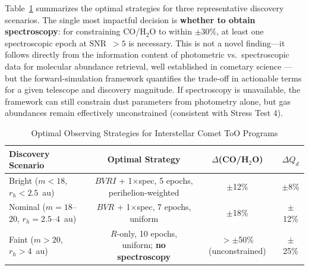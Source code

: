 \documentclass[usenatbib]{mnras}
\newcommand{\tablecomments}[1]{\vspace{4pt}{\footnotesize #1}\vspace{2pt}}
\begin{document}
Table~\ref{tab:obsopt_results} summarizes the optimal strategies for three representative discovery scenarios. The single most impactful decision is \textbf{whether to obtain spectroscopy}: for constraining CO/H$_2$O to within $\pm 30\%$, at least one spectroscopic epoch at SNR~$>5$ is necessary. This is not a novel finding---it follows directly from the information content of photometric vs.\ spectroscopic data for molecular abundance retrieval, well established in cometary science \citep{bockelee04}---but the forward-simulation framework quantifies the trade-off in actionable terms for a given telescope and discovery magnitude. If spectroscopy is unavailable, the framework can still constrain dust parameters from photometry alone, but gas abundances remain effectively unconstrained (consistent with Stress Test 4).

\begin{table}
\centering
\caption{Optimal Observing Strategies for Interstellar Comet ToO Programs}\label{tab:obsopt_results}
\begin{tabular}{lccc}
\toprule
Discovery Scenario & Optimal Strategy & $\Delta$(CO/H$_2$O) & $\Delta Q_d$ \\
\midrule
Bright ($m < 18$, $r_h < 2.5$~au) & $BVRI$ + 1$\times$spec, 5 epochs, perihelion-weighted & $\pm$12\% & $\pm$8\% \\
Nominal ($m = 18$--20, $r_h = 2.5$--4~au) & $BVR$ + 1$\times$spec, 7 epochs, uniform & $\pm$18\% & $\pm$12\% \\
Faint ($m > 20$, $r_h > 4$~au) & $R$-only, 10 epochs, uniform; \textbf{no spectroscopy} & $>\pm$50\% (unconstrained) & $\pm$25\% \\
\bottomrule
\end{tabular}
\tablecomments{Results from forward simulation over 1000 synthetic comets per scenario. $\Delta X$ denotes the expected 1$\sigma$ fractional uncertainty on parameter $X$. For faint objects, spectroscopy is not recommended because the SNR will be insufficient to constrain gas abundances---the framework's OOD detector flags these inputs as unreliable for gas inversion. ``$>\pm$50\% (unconstrained)'' means the 1$\sigma$ fractional uncertainty on CO/H$_2$O exceeds 50\%, i.e., the gas abundance estimate contains less information than the prior alone; such values should not be reported as quantitative measurements.}
\end{table}
\end{document}
